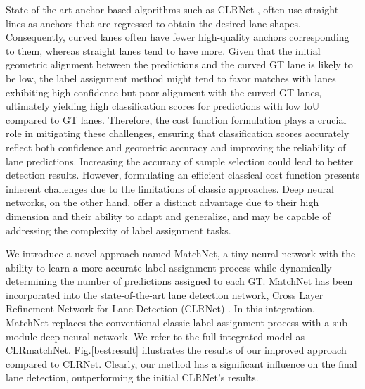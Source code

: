 \documentclass[10pt,twocolumn,letterpaper]{article}
\begin{document}
State-of-the-art anchor-based algorithms such as CLRNet \cite{CLRNet}, often use straight lines as anchors that are regressed to obtain the desired lane shapes. Consequently, curved lanes often have fewer high-quality anchors corresponding to them, whereas straight lanes tend to have more. Given that the initial geometric alignment between the predictions and the curved GT lane is likely to be low, the label assignment method might tend to favor matches with lanes exhibiting high confidence but poor alignment with the curved GT lanes, ultimately yielding high classification scores for predictions with low IoU compared to GT lanes. Therefore, the cost function formulation plays a crucial role in mitigating these challenges, ensuring that classification scores accurately reflect both confidence and geometric accuracy and improving the reliability of lane predictions. Increasing the accuracy of sample selection could lead to better detection results. However, formulating an efficient classical cost function presents inherent challenges due to the limitations of classic approaches. Deep neural networks, on the other hand, offer a distinct advantage due to their high dimension and their ability to adapt and generalize, and may be capable of addressing the complexity of label assignment tasks.

We introduce a novel approach named MatchNet, a tiny neural network with the ability to learn a more accurate label assignment process while dynamically determining the number of predictions assigned to each GT. MatchNet has been incorporated into the state-of-the-art lane detection network, Cross Layer Refinement Network for Lane Detection (CLRNet) \cite{CLRNet}. In this integration, MatchNet replaces the conventional classic label assignment process with a sub-module deep neural network. We refer to the full integrated model as CLRmatchNet. Fig.\ref{bestresult} illustrates the results of our improved approach compared to CLRNet. Clearly, our method has a significant influence on the final lane detection, outperforming the initial CLRNet’s results.
\end{document}
